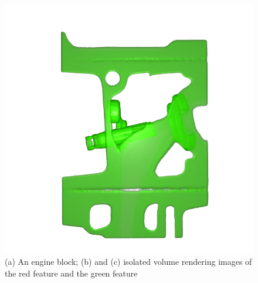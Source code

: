 \begin{figure}
\begin{minipage}{.33\textwidth}
	\end{minipage}~
	\begin{minipage}{.33\textwidth}
		\includegraphics[width=1\linewidth]{images/engine_naive_2}
	\end{minipage}
	\caption{(a) An engine block; (b) and (c) isolated volume rendering images of the red feature and the green feature}
	\label{fig:engine_naive}
\end{figure}

